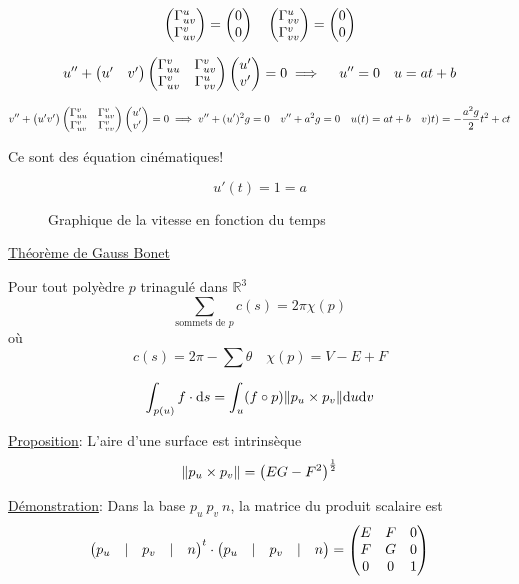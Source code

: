 $$\begin{pmatrix} \Gamma_{uv}^u \\ \Gamma_{uv}^v \end{pmatrix} = \begin{pmatrix} 0 \\ 0 \end{pmatrix} \quad \begin{pmatrix} \Gamma_{vv}^u \\ \Gamma_{vv}^v \end{pmatrix} = \begin{pmatrix} 0\\0  \end{pmatrix}$$ 


$$u'' + \begin{pmatrix} u' & v' \end{pmatrix}\begin{pmatrix} \Gamma_{uu}^v & \Gamma_{uv}^v \\ \Gamma_{uv}^v & \Gamma_{vv}^u  \end{pmatrix} \begin{pmatrix} u'\\ v' \end{pmatrix} =0 \implies \quad u'' = 0 \quad u = at + b$$ 

$$v'' + \begin{pmatrix} u' v' \end{pmatrix}\begin{pmatrix} \Gamma_{uu}^v & \Gamma_{uv}^v \\ \Gamma_{uv}^v & \Gamma_{vv}^v \end{pmatrix} \begin{pmatrix} u' \\ v' \end{pmatrix} = 0 \implies v'' + (u')^2g = 0 \quad v'' + a^2g =0 \quad u(t) =at+b \quad v)t) = - \frac{a^2g}{2} t^2 + ct $$ 

Ce sont des équation cinématiques!

$$u'(t) = 1 =a$$ 

\begin{figure}[ht]
    \centering
    \caption{Graphique de la vitesse en fonction du temps}
    \label{fig:graphique-de-la-vitesse-en-fonction-du-temps}
\end{figure}


\underline{Théorème de Gauss Bonet} 

\begin{tcolorbox}[title=Rappel: Gauss Bonet discret]
	Pour tout polyèdre $p$ trinagulé dans $\mathbb{R}^{3} $ $$\sum_{\text{sommets de }p} c(s) = 2\pi \chi(p)$$ où $$c(s) = 2\pi - \sum \theta \quad \chi(p) = V-E+F$$   
\end{tcolorbox}

\begin{tcolorbox}[title=Rappel: L'intégrale d'une fonction sur une surface $S$ avec $f:s\to \mathbb{R}$ ]
	 $$\int_{p(u)} f \cdot  \dd s = \int_u (f\circ p) \norm{p_u \times  p_v} \dd u \dd v $$ 
\end{tcolorbox}

\underline{Proposition}: L'aire d'une surface est intrinsèque $$\norm{p_u \times  p_v} = \left( EG - F^2 \right)^{\frac{1}{2} }$$  

\underline{Démonstration}: Dans la base $p_{u} \ p_v \ n $, la matrice du produit scalaire est $$\begin{pmatrix} p_u & | & p_v & | & n \end{pmatrix}^t \cdot \begin{pmatrix} p_u & | & p_v &|& n \end{pmatrix} = \begin{pmatrix} E & F & 0\\ F & G &0 \\ 0 & 0 & 1 \end{pmatrix}$$  

